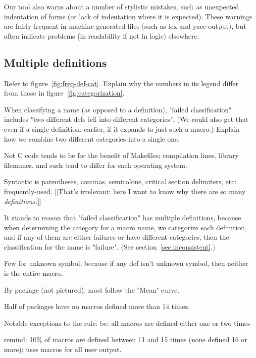 \documentclass[10pt]{article}
\newcommand{\pkg}[1]{\textsf{#1}}
\begin{document}
Our tool also warns about a number of stylistic mistakes, such as
unexpected indentation of forms (or lack of indentation where it is
expected).  These warnings are fairly frequent in machine-generated files
(such as lex and yacc output), but often indicate problems (in readability
if not in logic) elsewhere.


\subsection{Multiple definitions}

Refer to figure~\ref{fig:freq-def-cat}.  Explain why the numbers in its
legend differ from those in figure~\ref{fig:categorization}.

        When classifying a name (as opposed to a definition), "failed
          classification" includes "two different defs fell into different
          categories".  (We could also get that even if a single
          definition, earlier, if it expands to just such a macro.)
          Explain how we combine two different categories into a single one.

        Not C code tends to be for the benefit of Makefiles; compilation
          lines, library filenames, and such tend to differ for each
          operating system.  

        Syntactic is parentheses, commas, semicolons, critical section
          delimiters, etc:  frequently-used.  [[That's irrelevant:  here I
          want to know why there are so many {\em definitions}.]]

        It stands to reason that "failed classification" has multiple
          definitions, because when determining the category for a macro
          name, we categorize each definition, and if any of them are
          either failures or have different categories, then the classification
          for the name is "failure".  (See section~\ref{sec:inconsistent}.)

        Few for unknown symbol, because if any def isn't unknown symbol,
          then neither is the entire macro.

        By package (not pictured):  most follow the "Mean" curve.

          Half of packages have no macros defined more than 14 times.

          Notable exceptions to the rule:
            \pkg{bc}:  all macros are defined either one or two times

            \pkg{remind}:  10\% of macros are defined between 11 and 15 times
                (none defined 16 or more); uses macros for all user output.
                
\end{document}

